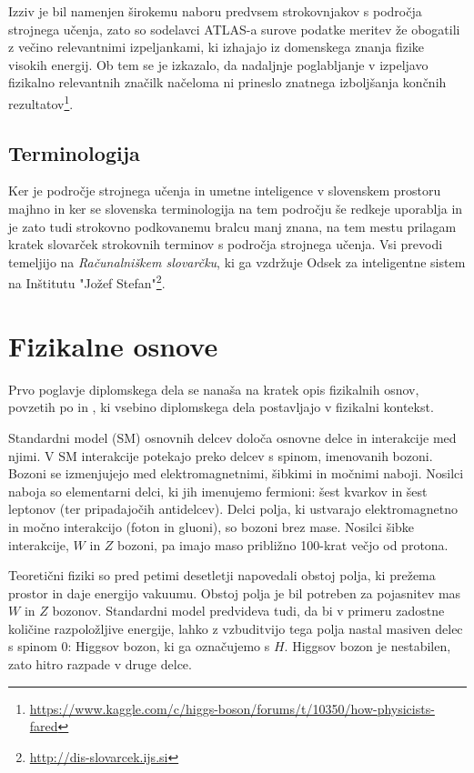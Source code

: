 \documentclass[11pt,a4paper,openany]{book}
\begin{document}
Izziv je bil namenjen širokemu naboru predvsem strokovnjakov s področja strojnega učenja, zato so sodelavci ATLAS-a surove podatke meritev že obogatili z večino relevantnimi izpeljankami, ki izhajajo iz domenskega znanja fizike visokih energij. Ob tem se je izkazalo, da nadaljnje poglabljanje v izpeljavo fizikalno relevantnih značilk načeloma ni prineslo znatnega izboljšanja končnih rezultatov\footnote{\url{https://www.kaggle.com/c/higgs-boson/forums/t/10350/how-physicists-fared}}.


\section*{Terminologija}

Ker je področje strojnega učenja in umetne inteligence v slovenskem prostoru majhno in ker se slovenska terminologija na tem področju še redkeje uporablja in je zato tudi strokovno podkovanemu bralcu manj znana, na tem mestu prilagam kratek slovarček strokovnih terminov s področja strojnega učenja. Vsi prevodi temeljijo na \textit{Računalniškem slovarčku}, ki ga vzdržuje Odsek za inteligentne sistem na Inštitutu "Jožef Stefan"\footnote{\url{http://dis-slovarcek.ijs.si}}.



\chapter{Fizikalne osnove}
\label{ch:basics}
Prvo poglavje diplomskega dela se nanaša na kratek opis fizikalnih osnov, povzetih po \cite{AadScience2012} in \cite{ChallengeDoc}, ki vsebino diplomskega dela  postavljajo v fizikalni kontekst. 

Standardni model (SM) osnovnih delcev določa osnovne delce in interakcije med njimi. V SM interakcije potekajo preko delcev s spinom, imenovanih bozoni. Bozoni se izmenjujejo med elektromagnetnimi, šibkimi in močnimi naboji. Nosilci naboja so elementarni delci, ki jih imenujemo fermioni: šest kvarkov in šest leptonov (ter pripadajočih antidelcev). Delci polja, ki ustvarajo elektromagnetno in močno interakcijo (foton in gluoni), so bozoni brez mase. Nosilci šibke interakcije, $W$ in $Z$ bozoni, pa imajo maso približno 100-krat večjo od protona. 

Teoretični fiziki so pred petimi desetletji napovedali obstoj polja, ki prežema prostor in daje energijo vakuumu. Obstoj polja je bil potreben za pojasnitev mas $W$ in $Z$ bozonov. Standardni model predvideva tudi, da bi v primeru zadostne količine razpoložljive energije, lahko z vzbuditvijo tega polja nastal masiven delec s spinom 0: Higgsov bozon, ki ga označujemo s $H$. Higgsov bozon je nestabilen, zato hitro razpade v druge delce. 
\end{document}

